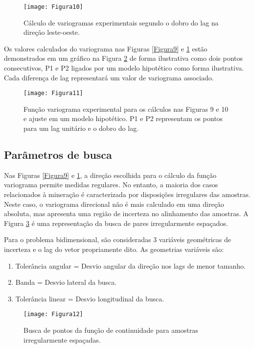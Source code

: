 \begin{figure}[!]
	\centering
	\texttt{[image: Figura10]}
	\caption{Cálculo de variogramas experimentais segundo o dobro do lag na direção leste-oeste.}
	\label{Figura10}
\end{figure}

Os valores calculados do variograma nas  Figuras \ref{Figura9} e \ref{Figura10} estão demonstrados em um gráfico na Figura \ref{Figura11} de forma ilustrativa como dois pontos consecutivos, P1 e P2 ligados por um modelo hipotético como forma ilustrativa. Cada diferença de lag representará um valor de variograma associado. 

\begin{figure}[!]
	\centering
	\texttt{[image: Figura11]}
	\caption{Função variograma experimental para os cálculos nas Figuras 9 e 10 e ajuste em um modelo hipotético. P1 e P2 representam os pontos para um lag unitário e o dobro do lag.}
	\label{Figura11}
\end{figure}

\subsection{Parâmetros de busca}

Nas Figuras \ref{Figura9} e \ref{Figura10}, a direção escolhida para o cálculo da função variograma permite medidas regulares. No entanto, a maioria dos casos relacionados à mineração é caracterizada por disposições irregulares das amostras. Neste caso, o variograma direcional não é mais calculado em uma direção absoluta, mas apresenta uma região de incerteza no alinhamento das amostras. A Figura \ref{Figura12} é uma representação da busca de pares irregularmente espaçados.

Para o problema bidimensional, são consideradas 3 variáveis geométricas de incerteza e o lag do vetor propriamente dito. As geometrias variáveis são:

\begin{enumerate}
	\item 	Tolerância angular = Desvio angular da direção nos lags de menor tamanho.
	\item 	Banda = Desvio lateral da busca. 
	\item	Tolerância linear = Desvio longitudinal da busca.
	
\end{enumerate}

\begin{figure}[!]
	\centering
	\texttt{[image: Figura12]}
	\caption{Busca de pontos da função de continuidade para amostras irregularmente espaçadas.}
	\label{Figura12}
\end{figure}

